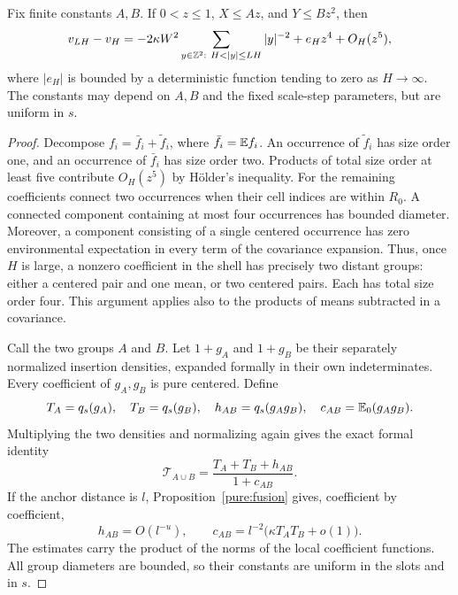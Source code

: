 \begin{lemma}\label{var:shell}
Fix finite constants $A,B$.  If $0<z\le1$, $X\le Az$, and
$Y\le Bz^2$, then
\begin{equation}
 v_{LH}-v_H
 =-2\kappa W^2\sum_{y\in\Z^2:\ H<|y|\le LH}|y|^{-2}
   +e_H z^4+O_H(z^5),
 \label{var:shell-formula}
\end{equation}
where $|e_H|$ is bounded by a deterministic function tending to zero
as $H\to\infty$.  The constants may depend on $A,B$ and the fixed
scale-step parameters, but are uniform in $s$.
\end{lemma}
\begin{proof}
Decompose $f_i=\bar f_i+\widetilde f_i$, where
$\bar f_i=\mathbb E f_i$.  An occurrence of $\widetilde f_i$ has size order
one, and an occurrence of $\bar f_i$ has size order two.  Products
of total size order at least five contribute $O_H(z^5)$ by
H\"older's inequality.  For the remaining coefficients connect two
occurrences when their cell indices are within $R_0$.  A connected
component containing at most four occurrences has bounded diameter.
Moreover, a component consisting of a single centered occurrence
has zero environmental expectation in every term of the covariance
expansion.  Thus, once $H$ is large, a nonzero coefficient in the shell
has precisely two distant groups: either a centered pair and one mean,
or two centered pairs.  Each has total size order four.  This argument
applies also to the products of means subtracted in a covariance.

Call the two groups $A$ and $B$.  Let $1+g_A$ and $1+g_B$ be their
separately normalized insertion densities, expanded formally in their
own indeterminates.  Every coefficient of $g_A,g_B$ is pure centered.
Define
\begin{equation}
 T_A=q_s(g_A),\quad T_B=q_s(g_B),\quad
 h_{AB}=q_s(g_Ag_B),\quad c_{AB}=\mathbb E_0(g_Ag_B).
 \label{var:two-group-quantities}
\end{equation}
Multiplying the two densities and normalizing again gives the exact
formal identity
\begin{equation}
 \mathcal T_{A\cup B}
       =\frac{T_A+T_B+h_{AB}}{1+c_{AB}}.
 \label{var:two-group-identity}
\end{equation}
If the anchor distance is $l$, Proposition~\ref{pure:fusion} gives,
coefficient by coefficient,
\begin{equation}
 h_{AB}=O(l^{-u}),\qquad
 c_{AB}=l^{-2}\bigl(\kappa T_AT_B+o(1)\bigr).
 \label{var:cross-coefficient-bounds}
\end{equation}
The estimates carry the product of the norms of the local coefficient
functions.  All group diameters are bounded, so their constants are
uniform in the slots and in $s$.


\end{proof}
